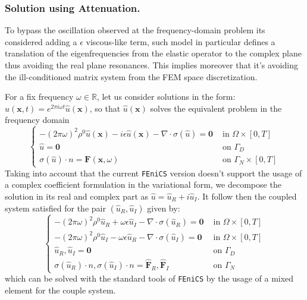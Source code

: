 \subsubsection{Solution using Attenuation.}
To bypass the oscillation observed at the frequency-domain problem its considered adding a $\epsilon$ viscous-like term, such model in particular defines a translation of the eigenfrequencies from the elastic operator to the complex plane thus avoiding the real plane resonances. This implies moreover that it's avoiding the ill-conditioned matrix system from the FEM space discretization.

For a fix frequency $\omega \in \mathbb{R}$, let us consider solutions in the form: $u(\mathbf{x},t) = e^{2 \pi i \omega t}\hat{u}(\mathbf{x})$, so that $\hat{u}(\mathbf{x})$ solves the equivalent problem in the frequency domain
\begin{equation*}
    \left \{
    \begin{array}{ccc}
        -(2\pi \omega)^2 \rho^0 \hat{u}(\mathbf{x}) - i \epsilon \hat{u}(\mathbf{x}) - \nabla \cdot \sigma(\hat{u}) = \mathbf{0} & \text{ in } \Omega \times [0,T] \\
        \hat{u} = \mathbf{0} & \text{ on } \Gamma_D\\
        \sigma(\hat{u}) \cdot n = \mathbf{F}(\mathbf{x}, \omega) & \text{ on }\Gamma_N \times [0,T]
    \end{array}
    \right .
\end{equation*}
Taking into account that the current \texttt{FEniCS} version doesn't support the usage of a complex coefficient formulation in the variational form, we decompose the solution in its real and complex part as $\hat{u} = \hat{u}_R + i \hat{u}_I$. It follow then the coupled system satisfied for the pair $(\hat{u}_R, \hat{u}_I)$ given by:
\begin{equation*}
    \left \{
    \begin{array}{cc}
        -(2\pi \omega)^2 \rho^0 \hat{u}_R +  \omega \epsilon \hat{u}_I - \nabla \cdot \sigma (\hat{u}_R) = \mathbf{0} & \text{ in }\Omega \times [0,T] \\
        -(2\pi \omega)^2 \rho^0 \hat{u}_I - \omega \epsilon \hat{u}_R - \nabla \cdot \sigma (\hat{u}_I) = \mathbf{0} & \text{ in }\Omega \times [0, T] \\
        \hat{u}_R, \hat{u}_I = \mathbf{0} & \text{ on } \Gamma_D \\
        \sigma(\hat{u}_R)\cdot n, \sigma(\hat{u}_I)\cdot n = \hat{\mathbf{F}}_R, \hat{\mathbf{F}}_I & \text{ on }\Gamma_N
    \end{array}
    \right.
\end{equation*}
which can be solved with the standard tools of \texttt{FEniCS} by the usage of a mixed element for the couple system.

